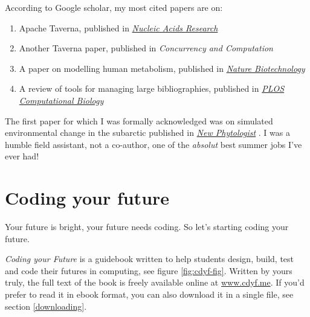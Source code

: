 \documentclass[
  12pt,
]{book}
\providecommand{\tightlist}{%
  \setlength{\itemsep}{0pt}\setlength{\parskip}{0pt}}
\begin{document}
According to Google scholar, my most cited papers are on:

\begin{enumerate}
\def\labelenumi{\arabic{enumi}.}
\tightlist
\item
  Apache Taverna, published in \href{https://en.wikipedia.org/wiki/Nucleic_Acids_Research}{\emph{Nucleic Acids Research}} \citep{taverna}\\
\item
  Another Taverna paper, published in \emph{Concurrency and Computation} \citep{Oinn2006}\\
\item
  A paper on modelling human metabolism, published in \href{https://en.wikipedia.org/wiki/Nature_Biotechnology}{\emph{Nature Biotechnology}} \citep{Thiele2013}
\item
  A review of tools for managing large bibliographies, published in \href{https://en.wikipedia.org/wiki/PLOS_Computational_Biology}{\emph{PLOS Computational Biology}} \citep{defrosting}
\end{enumerate}

The first paper for which I was formally acknowledged was on simulated environmental change in the subarctic published in \href{https://en.wikipedia.org/wiki/New_Phytologist}{\emph{New Phytologist}} \citep{subarctic}. I was a humble field assistant, not a co-author, one of the \emph{absolut} best summer jobs I've ever had!

\hypertarget{coding-your-future}{%
\chapter{Coding your future}\label{coding-your-future}}

Your future is bright, your future needs coding. So let's starting coding your future.

\emph{Coding your Future} is a guidebook written to help students design, build, test and code their futures in computing, see figure \ref{fig:cdyf-fig}. Written by yours truly, \citep{cdyf} the full text of the book is freely available online at \href{https://www.cdyf.me}{www.cdyf.me}. If you'd prefer to read it in ebook format, you can also download it in a single file, see section \ref{downloading}.
\end{document}
